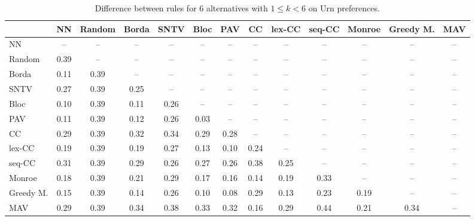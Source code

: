 
\begin{table*}[h!]
\centering
\begin{tabular}{lcccccccccccc}
\toprule
 & NN & Random & Borda & SNTV & Bloc & PAV & CC & lex-CC & seq-CC & Monroe & Greedy M. & MAV \\
\midrule
NN & -- & -- & -- & -- & -- & -- & -- & -- & -- & -- & -- & -- \\
Random & 0.39 & -- & -- & -- & -- & -- & -- & -- & -- & -- & -- & -- \\
Borda & 0.11 & 0.39 & -- & -- & -- & -- & -- & -- & -- & -- & -- & -- \\
SNTV & 0.27 & 0.39 & 0.25 & -- & -- & -- & -- & -- & -- & -- & -- & -- \\
Bloc & 0.10 & 0.39 & 0.11 & 0.26 & -- & -- & -- & -- & -- & -- & -- & -- \\
PAV & 0.11 & 0.39 & 0.12 & 0.26 & 0.03 & -- & -- & -- & -- & -- & -- & -- \\
CC & 0.29 & 0.39 & 0.32 & 0.34 & 0.29 & 0.28 & -- & -- & -- & -- & -- & -- \\
lex-CC & 0.19 & 0.39 & 0.19 & 0.27 & 0.13 & 0.10 & 0.24 & -- & -- & -- & -- & -- \\
seq-CC & 0.31 & 0.39 & 0.29 & 0.26 & 0.27 & 0.26 & 0.38 & 0.25 & -- & -- & -- & -- \\
Monroe & 0.18 & 0.39 & 0.21 & 0.29 & 0.17 & 0.16 & 0.14 & 0.19 & 0.33 & -- & -- & -- \\
Greedy M. & 0.15 & 0.39 & 0.14 & 0.26 & 0.10 & 0.08 & 0.29 & 0.13 & 0.23 & 0.19 & -- & -- \\
MAV & 0.29 & 0.39 & 0.34 & 0.38 & 0.33 & 0.32 & 0.16 & 0.29 & 0.44 & 0.21 & 0.34 & -- \\
\bottomrule
\end{tabular}

\caption{Difference between rules for 6 alternatives with $1 \leq k < 6$ on Urn preferences.}
\end{table*}
